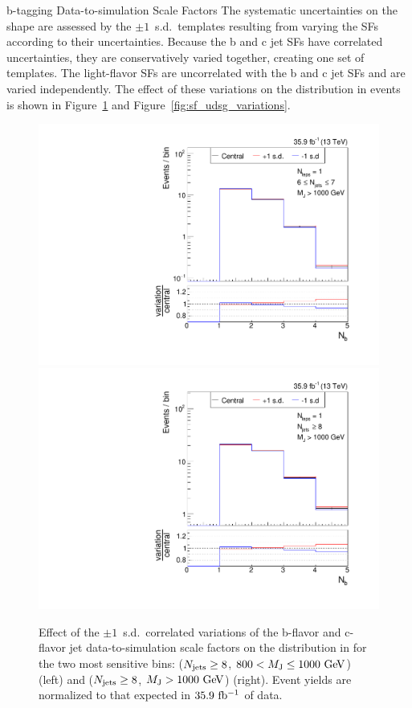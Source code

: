 \begin{section}{b-tagging Data-to-simulation Scale Factors}
The systematic uncertainties on the \Nb shape are assessed by the $\pm 1$~s.d.\ \Nb templates resulting from varying the SFs according to their uncertainties.
Because the b and c jet SFs have correlated uncertainties, they are conservatively varied together, creating one set of templates.
The light-flavor SFs are uncorrelated with the b and c jet SFs and are varied independently.
The effect of these variations on the \Nb distribution in \ttbar events is shown in Figure~\ref{fig:sf_bc_variations} and Figure~\ref{fig:sf_udsg_variations}.

\begin{figure}[tbp!]
\begin{center}
\includegraphics[angle=0,width=0.45\columnwidth]{fig/bin20_ttbar_btag_bc_mconly.pdf}
\includegraphics[angle=0,width=0.45\columnwidth]{fig/bin21_ttbar_btag_bc_mconly.pdf}
\end{center}
\caption{Effect of the $\pm 1$~s.d.\ correlated variations of the b-flavor and c-flavor jet data-to-simulation scale factors on the \Nb distribution in \ttbar for the two most sensitive bins: ($N_{\mathrm{jets}} \geq 8$, $800 < M_{\mathrm{J}} \leq 1000~\mathrm{Ge\kern -0.1em V}$) (left) and ($N_{\mathrm{jets}} \geq 8$, $M_{\mathrm{J}} > 1000~\mathrm{Ge\kern -0.1em V}$) (right).
Event yields are normalized to that expected in $35.9~\mathrm{fb^{-1}}$ of data.}
\label{fig:sf_bc_variations}
\end{figure}


\end{section}
